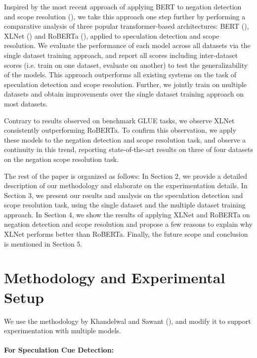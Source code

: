 \documentclass[runningheads]{llncs}
\begin{document}
\par Inspired by the most recent approach of applying BERT to negation detection and scope resolution (\cite{2019arXiv191104211K}), we take this approach one step further by performing a comparative analysis of three popular transformer-based architectures: BERT (\cite{DBLP:journals/corr/abs-1810-04805}), XLNet (\cite{DBLP:journals/corr/abs-1906-08237}) and RoBERTa (\cite{DBLP:journals/corr/abs-1907-11692}), applied to speculation detection and scope resolution. We evaluate the performance of each model across all datasets via the single dataset training approach, and report all scores including inter-dataset scores (i.e. train on one dataset, evaluate on another) to test the generalizability of the models. This approach outperforms all existing systems on the task of speculation detection and scope resolution. Further, we jointly train on multiple datasets and obtain improvements over the single dataset training approach on most datasets.\par
Contrary to results observed on benchmark GLUE tasks, we observe XLNet consistently outperforming RoBERTa. To confirm this observation, we apply these models to the negation detection and scope resolution task, and observe a continuity in this trend, reporting state-of-the-art results on three of four datasets on the negation scope resolution task.\par
The rest of the paper is organized as follows: In Section 2, we provide a detailed description of our methodology and elaborate on the experimentation details. In Section 3, we present our results and analysis on the speculation detection and scope resolution task, using the single dataset and the multiple dataset training approach. In Section 4, we show the results of applying XLNet and RoBERTa on negation detection and scope resolution and propose a few reasons to explain why XLNet performs better than RoBERTa. Finally, the future scope and conclusion is mentioned in Section 5.

\section{Methodology and Experimental Setup}
\setlength{\parindent}{5ex}
\par We use the methodology by Khandelwal and Sawant (\cite{2019arXiv191104211K}), and modify it to support experimentation with multiple models.\\
\\
\textbf{For Speculation Cue Detection:}
\end{document}
